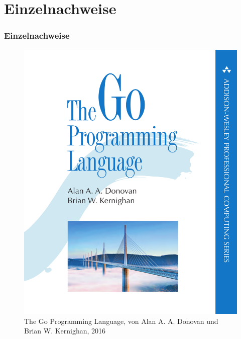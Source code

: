 \documentclass{beamer}
\begin{document}
\section{Einzelnachweise}
\begin{frame}
\frametitle{Einzelnachweise}


\begin{figure}
\includegraphics[scale=0.3]{book.png}
\caption{The Go Programming Language, von Alan A. A. Donovan und Brian W. Kernighan, 2016}
\end{figure}

\end{frame}
\end{document}
